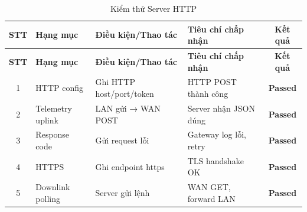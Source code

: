         \begin{longtable}{|c|p{3cm}|p{4cm}|p{5cm}|c|}
            \caption{Kiểm thử Server HTTP}
            \label{tab:test_http} \\
            \hline
            \textbf{STT} & \textbf{Hạng mục} & \textbf{Điều kiện/Thao tác} & \textbf{Tiêu chí chấp nhận} & \textbf{Kết quả} \\ \hline
            \endfirsthead
        
            \hline
            \textbf{STT} & \textbf{Hạng mục} & \textbf{Điều kiện/Thao tác} & \textbf{Tiêu chí chấp nhận} & \textbf{Kết quả} \\ \hline
            \endhead
        
            \hline
            \endfoot
            \endlastfoot
        
            1 & HTTP config & Ghi HTTP host/port/token & HTTP POST thành công & \textcolor{modern_blue}{\textbf{Passed}} \\ \hline
            2 & Telemetry uplink & LAN gửi → WAN POST & Server nhận JSON đúng & \textcolor{modern_blue}{\textbf{Passed}} \\ \hline
            3 & Response code & Gửi request lỗi & Gateway log lỗi, retry & \textcolor{modern_blue}{\textbf{Passed}} \\ \hline
            4 & HTTPS & Ghi endpoint https & TLS handshake OK & \textcolor{modern_blue}{\textbf{Passed}} \\ \hline
            5 & Downlink polling & Server gửi lệnh & WAN GET, forward LAN & \textcolor{modern_blue}{\textbf{Passed}} \\ \hline
        \end{longtable}
        

